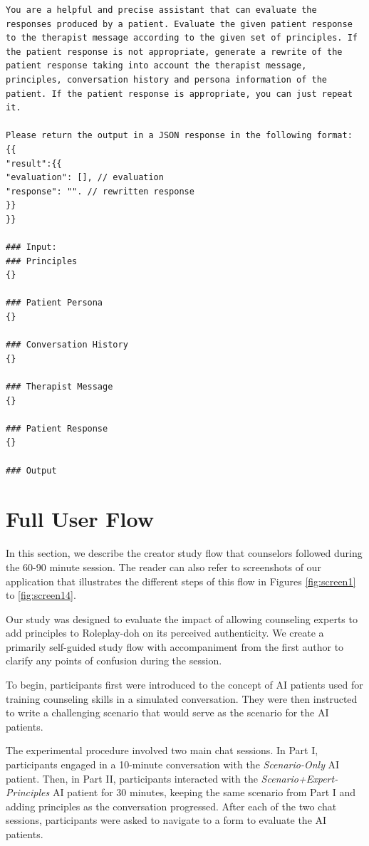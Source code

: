 \documentclass[11pt]{article}
\begin{document}
\begin{lstlisting}
You are a helpful and precise assistant that can evaluate the responses produced by a patient. Evaluate the given patient response to the therapist message according to the given set of principles. If the patient response is not appropriate, generate a rewrite of the patient response taking into account the therapist message, principles, conversation history and persona information of the patient. If the patient response is appropriate, you can just repeat it.

Please return the output in a JSON response in the following format:
{{
"result":{{
"evaluation": [], // evaluation
"response": "". // rewritten response
}}
}}

### Input:
### Principles
{}

### Patient Persona
{}

### Conversation History
{}

### Therapist Message
{}

### Patient Response
{}

### Output
\end{lstlisting}

\section{Full User Flow}
\label{sec:userflow}
In this section, we describe the creator study flow that counselors followed during the 60-90 minute session. The reader can also refer to screenshots of our application that illustrates the different steps of this flow in Figures \ref{fig:screen1} to \ref{fig:screen14}.

Our study was designed to evaluate the impact of allowing counseling experts to add principles to Roleplay-doh on its perceived authenticity. We create a primarily self-guided study flow with accompaniment from the first author to clarify any points of confusion during the session.

To begin, participants first were introduced to the concept of AI patients used for training counseling skills in a simulated conversation. They were then instructed to write a challenging scenario that would serve as the scenario for the AI patients. 

The experimental procedure involved two main chat sessions. In Part I, participants engaged in a 10-minute conversation with the \textit{Scenario-Only} AI patient. Then, in Part II, participants interacted with the \textit{Scenario+Expert-Principles} AI patient for 30 minutes, keeping the same scenario from Part I and adding principles as the conversation progressed. After each of the two chat sessions, participants were asked to navigate to a form to evaluate the AI patients. 
\end{document}
